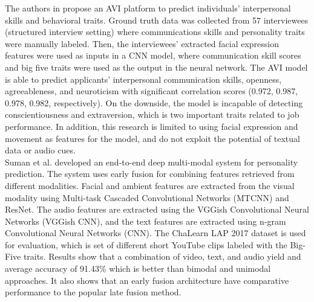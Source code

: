 The authors in \cite{video-interview3-suen2020intelligent} propose an AVI platform to predict individuals' interpersonal skills and behavioral traits. Ground truth data was collected from 57 interviewees (structured interview setting) where communications skills and personality traits were manually labeled. Then, the interviewees’ extracted facial expression features were used as inputs in a CNN model, where communication skill scores and big five traits were used as the output in the neural network. The AVI model is able to predict applicants' interpersonal communication skills, openness, agreeableness, and neuroticism with significant correlation scores (0.972, 0.987, 0.978, 0.982, respectively). On the downside, the model is incapable of detecting conscientiousness and extraversion, which is two important traits related to job performance. In addition, this research is limited to using facial expression and movement as features for the model, and do not exploit the potential of textual data or audio cues. \\

Suman et al. \cite{video-interview4-SUMAN2022107715} developed an end-to-end deep multi-modal system for personality prediction. The system uses early fusion for combining features retrieved from different modalities. Facial and ambient features are extracted from the visual modality using Multi-task Cascaded Convolutional Networks (MTCNN) and ResNet. The audio features are extracted using the VGGish Convolutional Neural Networks (VGGish CNN), and the text features are extracted using n-gram Convolutional Neural Networks (CNN). The ChaLearn LAP 2017 dataset is used for evaluation, which is set of different short YouTube clips labeled with the Big-Five traits. Results show that a combination of video, text, and audio yield and average accuracy of 91.43\% which is better than bimodal and unimodal approaches. It also shows that an early fusion architecture have comparative performance to the popular late fusion method.  \\ 






